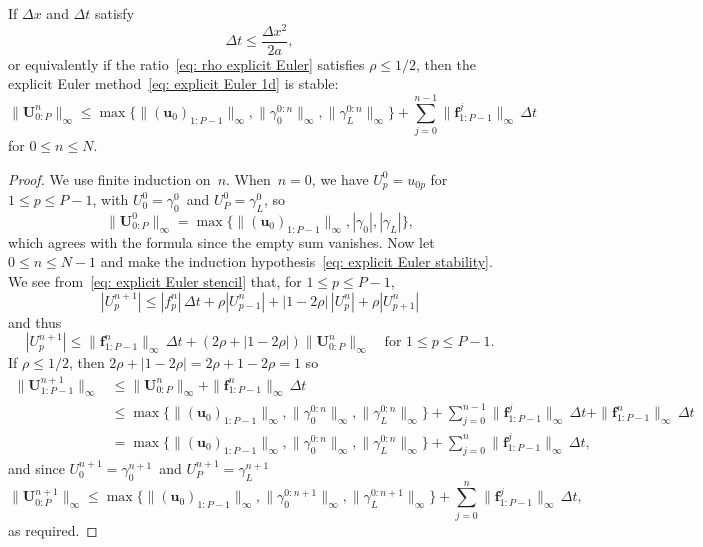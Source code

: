 \begin{theorem}\label{thm: explicit Euler stability}
If $\Delta x$ and $\Delta t$ satisfy
\begin{equation}\label{eq: explicit Euler timestep}
\Delta t\le\frac{\Delta x^2}{2a},                                        
\end{equation}
or equivalently if the ratio~\eqref{eq: rho explicit Euler} satisfies 
$\rho\le1/2$, then the explicit Euler method~\eqref{eq: explicit Euler 1d} is 
stable:
\begin{equation}\label{eq: explicit Euler stability}
\|\boldsymbol{U}^n_{0:P}\|_\infty
	\le\max\bigl\{\|(\boldsymbol{u}_0)_{1:P-1}\|_\infty, 
		\|\gamma_0^{0:n}\|_\infty,\|\gamma_L^{0:n}\|_\infty\bigr\}
	+\sum_{j=0}^{n-1}\|\boldsymbol{f}^j_{1:P-1}\|_\infty\,\Delta t
\end{equation}
for $0\le n\le N$.
\end{theorem}
\begin{proof}
We use finite induction on~$n$.  When~$n=0$, we have
$U^0_p=u_{0p}$ for~$1\le p\le P-1$, with $U^0_0=\gamma_0^0$~and 
$U^0_P=\gamma_L^0$, so 
\[
\|\boldsymbol{U}^0_{0:P}\|_\infty=
\max\bigl\{\|(\boldsymbol{u}_0)_{1:P-1}\|_\infty,|\gamma_0|,|\gamma_L|\bigr\},
\]
which agrees with the formula since the empty sum vanishes. Now let 
$0\le n\le N-1$ and make the induction
hypothesis~\eqref{eq: explicit Euler stability}.  We see
from~\eqref{eq: explicit Euler stencil} that, for $1\le p\le P-1$,
\[
|U^{n+1}_p|\le|f^n_p|\,\Delta t+\rho|U^n_{p-1}|+|1-2\rho|\,|U^n_p|
    +\rho|U^n_{p+1}|
\]
and thus
\[
|U^{n+1}_p|\le\|\boldsymbol{f}^n_{1:P-1}\|_\infty\,\Delta t
		+(2\rho+|1-2\rho|)\|\boldsymbol{U}^n_{0:P}\|_\infty
\quad\text{for $1\le p\le P-1$.} 
\]
If $\rho\le1/2$, then $2\rho+|1-2\rho|=2\rho+1-2\rho=1$ so
\begin{align*}
\|\boldsymbol{U}^{n+1}_{1:P-1}\|_\infty
	&\le\|\boldsymbol{U}^n_{0:P}\|_\infty
		+\|\boldsymbol{f}^n_{1:P-1}\|_\infty\,\Delta t\\
	&\le\max\bigl\{\|(\boldsymbol{u}_0)_{1:P-1}\|_\infty, 
		\|\gamma_0^{0:n}\|_\infty,\|\gamma_L^{0:n}\|_\infty\bigr\}
	+\sum_{j=0}^{n-1}\|\boldsymbol{f}^j_{1:P-1}\|_\infty\,\Delta t
		+\|\boldsymbol{f}^n_{1:P-1}\|_\infty\,\Delta t\\
	&=\max\bigl\{\|(\boldsymbol{u}_0)_{1:P-1}\|_\infty, 
		\|\gamma_0^{0:n}\|_\infty,\|\gamma_L^{0:n}\|_\infty\bigr\}
	+\sum_{j=0}^n\|\boldsymbol{f}^j_{1:P-1}\|_\infty\,\Delta t,
\end{align*}
and since $U^{n+1}_0=\gamma_0^{n+1}$~and $U^{n+1}_P=\gamma_L^{n+1}$
\[
\|\boldsymbol{U}^{n+1}_{0:P}\|_\infty
	\le\max\bigl\{\|(\boldsymbol{u}_0)_{1:P-1}\|_\infty, 
		\|\gamma_0^{0:n+1}\|_\infty,\|\gamma_L^{0:n+1}\|_\infty\bigr\}
	+\sum_{j=0}^n\|\boldsymbol{f}^j_{1:P-1}\|_\infty\,\Delta t,
\]
as required.
\end{proof}

